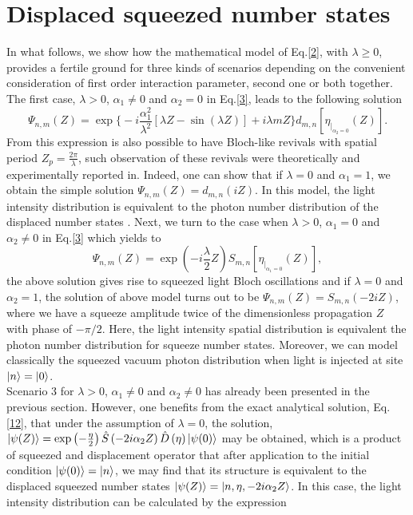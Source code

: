 \documentclass[12pt]{article}
\numberwithin{equation}{section}
\begin{document}
\section{Displaced squeezed number states}
In what follows, we show how the mathematical model of Eq.\eqref{2}, with $\lambda\geq 0$, provides a fertile ground for three kinds of scenarios depending on the convenient consideration of first order interaction parameter, second one or both together. The first case, $\lambda>0$, $\alpha_{1} \neq 0$ and $\alpha_{2} =0$  in Eq.\eqref{3}, leads to the following solution
\begin{equation} \label{22}
\Psi_{n,m}\left(Z \right)=\exp \Big\lbrace -i\frac{\alpha^2_{1}}{\lambda^2} \left[\lambda Z-\sin(\lambda Z)\right] + i \lambda m Z \Big\rbrace  d_{m,n} [\eta_{|_{\alpha_{2}=0}}(Z)].
\end{equation}
From this expression is also possible to have Bloch-like revivals with spatial period $Z_{p}=\frac{2\pi}{\lambda}$, such observation of these revivals were theoretically and experimentally reported in\cite{21.5}. Indeed, one can show that if $\lambda=0$ and $\alpha_{1}=1$, we obtain the simple solution $\Psi_{n,m}\left(Z \right)= d_{m,n} (i Z)$. In this model, the light intensity distribution is  equivalent to the photon number distribution of the displaced number states \cite{21}. Next, we turn to the case when $\lambda>0$, $\alpha_{1}=0$ and $\alpha_{2}  \neq 0$ in Eq.\eqref{3} which yields to
\begin{equation} \label{23}
\Psi_{n,m}\left(Z \right)=\exp\left(-i\frac{\lambda}{2} Z \right) S_{m,n} [\eta_{|_{\alpha_{1}=0}}(Z)],
\end{equation}
the above solution gives rise to squeezed light Bloch oscillations and if $\lambda=0$ and $\alpha_{2}=1$, the solution of above model turns out to be $\Psi_{n,m}\left(Z \right)= S_{m,n}(-2i Z)$, where we have a squeeze amplitude twice of the dimensionless propagation $Z$ with phase of $-\pi/2$. Here, the light intensity spatial distribution is equivalent  the photon number distribution for squeeze number states\cite{13A}. Moreover, we can model classically the squeezed vacuum photon distribution when light is injected at site $\ket{n}=\ket{0}$.\\
Scenario 3 for $\lambda>0$, $\alpha_{1} \neq0$ and $\alpha_{2} \neq0$ has already been presented in the previous section. However, one benefits from the exact analytical solution, Eq.\eqref{12},  that under the assumption of $\lambda=0$, the solution, $\ket{\psi(Z)}=\exp\left(-\frac{\eta}{2}\right) \hat{S}\left(-2i\alpha_{2} Z\right)  \hat{D}\left(\eta\right) \ket{\psi(0)}$ may be obtained, which is a product of squeezed and displacement operator that after application to the initial condition $\ket{\psi(0)}=\ket{n}$, we may find that its structure is equivalent to the displaced squeezed number states $\ket{\psi(Z)}=\ket{n,\eta,-2 i \alpha_{2} Z}$. In this case, the light intensity distribution can be calculated by the expression
\end{document}
